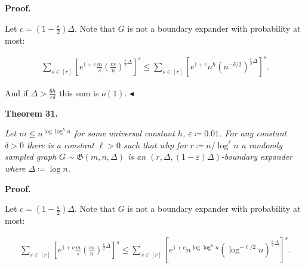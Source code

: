\documentclass[10pt,a4paper]{article}
\begin{document}




\par\medskip\noindent\textbf{Proof.}\par




Let $c=(1-\frac{\varepsilon}{2})\Delta$. Note that $G$ is not a boundary expander with
probability at most:\par


\[\begin{gathered}
\displaystyle\sum\limits_{s\in[r]}\left[e^{1+c}\frac{m}{s}\left(\frac{cs}{n}%
\right)^{\frac{\varepsilon}{2}\Delta}\right]^{s}\leq \displaystyle\sum\limits_{s\in[r]}\left[e^{1+c}n^{h}\left(n^{-\delta/2}\right)%
^{\frac{\varepsilon}{2}\Delta}\right]^{s}.
\end{gathered}\]


And if $\Delta>\frac{6h}{\varepsilon\delta}$ this sum is $o(1)$.
$\blacktriangleleft$\par





\par\medskip\noindent\textbf{
\textbf{Theorem 31}\textbf{.}
}\par



\emph{Let $m\leq n^{\log\log^{h}n}$ for some universal constant $h$, $\varepsilon\coloneqq 0.01$. For
any constant $\delta>0$ there is a constant $\ell>0$ such that whp for $r\coloneqq n/\log^{\ell}n$ a randomly sampled graph $G\sim\mathfrak{G}(m,n,\Delta)$ is an $(r,\Delta,(1-\varepsilon)\Delta)$-boundary expander where $\Delta\coloneqq\log n$.}\par







\par\medskip\noindent\textbf{Proof.}\par




Let $c=(1-\frac{\varepsilon}{2})\Delta$. Note that $G$ is not a boundary expander with
probability at most:\par


\[\begin{gathered}
\displaystyle\sum\limits_{s\in[r]}\left[e^{1+c}\frac{m}{s}\left(\frac{cs}{n}%
\right)^{\frac{\varepsilon}{2}\Delta}\right]^{s}\leq \displaystyle\sum\limits_{s\in[r]}\left[e^{1+c}n^{\log\log^{h}n}\left(\log^{-%
\ell/2}n\right)^{\frac{\varepsilon}{2}\Delta}\right]^{s}.
\end{gathered}\]
\end{document}
